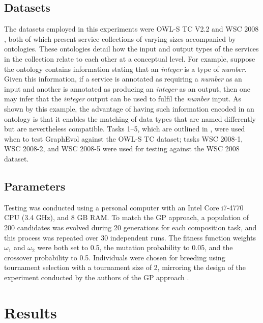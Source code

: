 \documentclass{article}
\begin{document}
\subsection{Datasets}
The datasets employed in this experiments were OWL-S TC V2.2 \cite{kuster2008opossum} and WSC 2008 \cite{bansal2008wsc}, both of which present service collections
of varying sizes accompanied by ontologies. These ontologies detail how the input and output types of the services in the collection relate to each other at
a conceptual level. For example, suppose the ontology contains information stating that an \textit{integer} is a type of \textit{number}. Given this information,
if a service is annotated as requiring a \textit{number} as an input and another is annotated as producing an \textit{integer} as an output, then one may infer
that the \textit{integer} output can be used to fulfil the \textit{number} input. As shown by this example, the advantage of having such information encoded in an
ontology is that it enables the matching of data types that are named differently but are nevertheless compatible. Tasks 1--5, which are outlined in \cite{rodriguez2010composition},
were used when to test GraphEvol against the OWL-S TC dataset; tasks WSC 2008-1, WSC 2008-2, and WSC 2008-5 were used for testing against the WSC 2008 dataset.

\subsection{Parameters}
Testing was conducted using a personal computer with an Intel Core i7-4770 CPU (3.4 GHz), and 8 GB RAM. To match the GP approach, a population of 200 candidates was
evolved during 20 generations for each composition task, and this process was repeated over 30 independent runs. The fitness function weights $\omega_1$ and $\omega_2$
were both set to 0.5, the mutation probability to 0.05, and the crossover probability to 0.5. Individuals were chosen for breeding using tournament selection with a 
tournament size of 2, mirroring the design of the experiment conducted by the authors of the GP approach \cite{rodriguez2010composition}.

\section{Results}\label{results}
\end{document}

